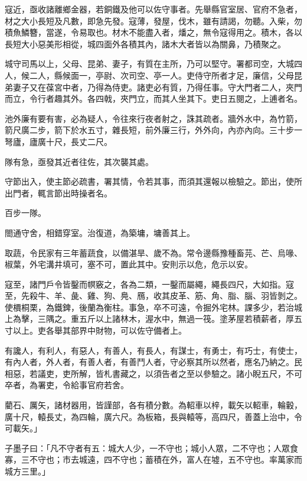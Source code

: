 \begin{pinyinscope}
寇近，亟收諸離鄉金器，若銅鐵及他可以佐守事者。先舉縣官室居、官府不急者，材之大小長短及凡數，即急先發。寇薄，發屋，伐木，雖有請謁，勿聽。入柴，勿積魚鱗簪，當遂，令易取也。材木不能盡入者，燔之，無令寇得用之。積木，各以長短大小惡美形相從，城四面外各積其內，諸木大者皆以為關鼻，乃積聚之。

城守司馬以上，父母、昆弟、妻子，有質在主所，乃可以堅守。署都司空，大城四人，候二人，縣候面一，亭尉、次司空、亭一人。吏侍守所者才足，廉信，父母昆弟妻子又在葆宮中者，乃得為侍吏。諸吏必有質，乃得任事。守大門者二人，夾門而立，令行者趣其外。各四戟，夾門立，而其人坐其下。吏日五閱之，上逋者名。

池外廉有要有害，必為疑人，令往來行夜者射之，誅其疏者。牆外水中，為竹箭，箭尺廣二步，箭下於水五寸，雜長短，前外廉三行，外外向，內亦內向。三十步一弩廬，廬廣十尺，長丈二尺。

隊有急，亟發其近者往佐，其次襲其處。

守節出入，使主節必疏書，署其情，令若其事，而須其還報以檢驗之。節出，使所出門者，輒言節出時操者名。

百步一隊。

閤通守舍，相錯穿室。治復道，為築墉，墉善其上。

取蔬，令民家有三年蓄蔬食，以備湛旱、歲不為。常令邊縣豫種畜芫、芒、烏喙、椒葉，外宅溝井填可，塞不可，置此其中。安則示以危，危示以安。

寇至，諸門戶令皆鑿而幎竅之，各為二類，一鑿而屬繩，繩長四尺，大如指。寇至，先殺牛、羊、彘、雞、狗、鳧、鴈，收其皮革、筋、角、脂、腦、羽皆剝之。使檟桐栗，為鐵錍，後蘭為衡柱。事急，卒不可遠，令掘外宅林。課多少，若治城上為擊，三隅之。重五斤以上諸林木，渥水中，無過一筏。塗茅屋若積薪者，厚五寸以上。吏各舉其部界中財物，可以佐守備者上。

有讒人，有利人，有惡人，有善人，有長人，有謀士，有勇士，有巧士，有使士，有內人者，外人者，有善人者，有善鬥人者，守必察其所以然者，應名乃納之。民相惡，若議吏，吏所解，皆札書藏之，以須告者之至以參驗之。諸小睨五尺，不可卒者，為署吏，令給事官府若舍。

藺石、厲矢，諸材器用，皆謹部，各有積分數。為軺車以梓，載矢以軺車，輪轂，廣十尺，轅長丈，為四輪，廣六尺。為板箱，長與轅等，高四尺，善蓋上治中，令可載矢。」

子墨子曰：「凡不守者有五：城大人少，一不守也；城小人眾，二不守也；人眾食寡，三不守也；市去城遠，四不守也；蓄積在外，富人在墟，五不守也。率萬家而城方三里。」


\end{pinyinscope}